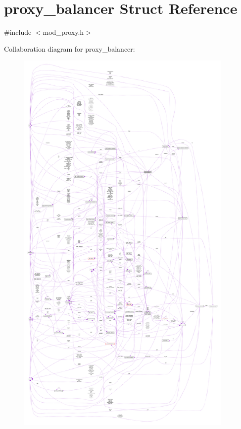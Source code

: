 \hypertarget{structproxy__balancer}{}\section{proxy\+\_\+balancer Struct Reference}
\label{structproxy__balancer}


{\ttfamily \#include $<$mod\+\_\+proxy.\+h$>$}



Collaboration diagram for proxy\+\_\+balancer\+:
\nopagebreak
\begin{figure}[H]
\begin{center}
\leavevmode
\includegraphics[height=550pt]{structproxy__balancer__coll__graph}
\end{center}
\end{figure}
